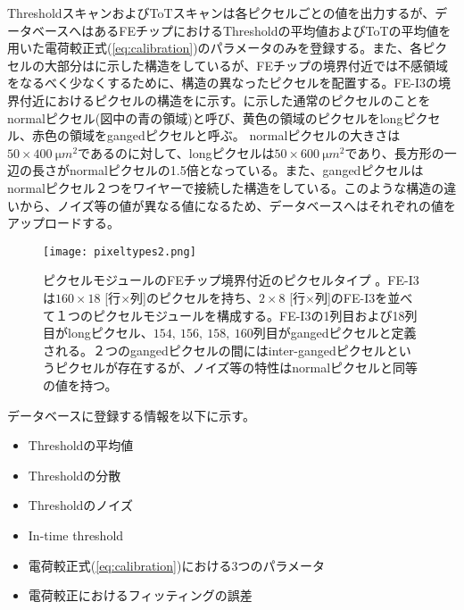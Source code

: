 ThresholdスキャンおよびToTスキャンは各ピクセルごとの値を出力するが、データベースへはあるFEチップにおけるThresholdの平均値およびToTの平均値を用いた電荷較正式(\ref{eq:calibration})のパラメータのみを登録する。また、各ピクセルの大部分はに示した構造をしているが、FEチップの境界付近では不感領域をなるべく少なくするために、構造の異なったピクセルを配置する。FE-I3の境界付近におけるピクセルの構造をに示す。に示した通常のピクセルのことをnormalピクセル(図中の青の領域)と呼び、黄色の領域のピクセルをlongピクセル、赤色の領域をgangedピクセルと呼ぶ。
normalピクセルの大きさは$50\times 400\ \si{\micro m^2}$であるのに対して、longピクセルは$50\times 600\ \si{\micro m^2}$であり、長方形の一辺の長さがnormalピクセルの1.5倍となっている。また、gangedピクセルはnormalピクセル２つをワイヤーで接続した構造をしている。このような構造の違いから、ノイズ等の値が異なる値になるため、データベースへはそれぞれの値をアップロードする。


\begin{figure}[tbp]
  \centering
  \texttt{[image: pixeltypes2.png]}
  \caption[ピクセルモジュールのFEチップ境界付近のピクセルタイプ]{ピクセルモジュールのFEチップ境界付近のピクセルタイプ \cite{pixeltypes}。FE-I3は$160\times18$ [行$\times$列]のピクセルを持ち、$2\times8$ [行$\times$列]のFE-I3を並べて１つのピクセルモジュールを構成する。FE-I3の1列目および18列目がlongピクセル、$154,\ 156,\ 158,\ 160$列目がgangedピクセルと定義される。２つのgangedピクセルの間にはinter-gangedピクセルというピクセルが存在するが、ノイズ等の特性はnormalピクセルと同等の値を持つ。}
  \label{fig:pixeltypes}
\end{figure}

データベースに登録する情報を以下に示す。
\begin{itemize}
  \item Thresholdの平均値
  \item Thresholdの分散
  \item Thresholdのノイズ
  \item In-time threshold
  \item 電荷較正式(\ref{eq:calibration})における3つのパラメータ
  \item 電荷較正におけるフィッティングの誤差
\end{itemize}




\newpage
